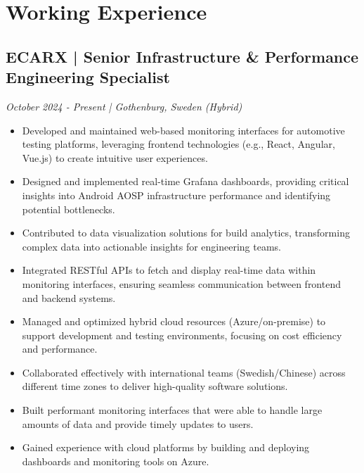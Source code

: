 \documentclass[11pt,a4paper]{article}
\begin{document}
\section*{Working Experience}

\subsection*{ECARX | Senior Infrastructure \& Performance Engineering Specialist}
\textit{October 2024 - Present | Gothenburg, Sweden (Hybrid)}
\begin{itemize}[noitemsep]
\item Developed and maintained web-based monitoring interfaces for automotive testing platforms, leveraging frontend technologies (e.g., React, Angular, Vue.js) to create intuitive user experiences.
\item Designed and implemented real-time Grafana dashboards, providing critical insights into Android AOSP infrastructure performance and identifying potential bottlenecks.
\item Contributed to data visualization solutions for build analytics, transforming complex data into actionable insights for engineering teams.
\item Integrated RESTful APIs to fetch and display real-time data within monitoring interfaces, ensuring seamless communication between frontend and backend systems.
\item Managed and optimized hybrid cloud resources (Azure/on-premise) to support development and testing environments, focusing on cost efficiency and performance.
\item Collaborated effectively with international teams (Swedish/Chinese) across different time zones to deliver high-quality software solutions.
\item Built performant monitoring interfaces that were able to handle large amounts of data and provide timely updates to users.
\item Gained experience with cloud platforms by building and deploying dashboards and monitoring tools on Azure.
\end{itemize}
\end{document}
